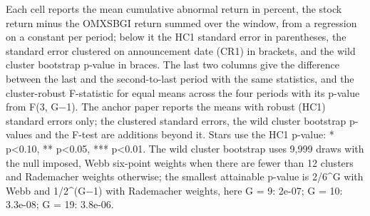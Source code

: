 \begin{threeparttable}
\begin{minipage}{\linewidth}
Each cell reports the mean cumulative abnormal return in percent, the stock return minus the OMXSBGI return summed over the window, from a regression on a constant per period; below it the HC1 standard error in parentheses, the standard error clustered on announcement date (CR1) in brackets, and the wild cluster bootstrap p-value in braces. The last two columns give the difference between the last and the second-to-last period with the same statistics, and the cluster-robust F-statistic for equal means across the four periods with its p-value from F(3, G$-$1). The anchor paper reports the means with robust (HC1) standard errors only; the clustered standard errors, the wild cluster bootstrap p-values and the F-test are additions beyond it. Stars use the HC1 p-value: * p<0.10, ** p<0.05, *** p<0.01. The wild cluster bootstrap uses 9,999 draws with the null imposed, Webb six-point weights when there are fewer than 12 clusters and Rademacher weights otherwise; the smallest attainable p-value is 2/6\textasciicircum{}G with Webb and 1/2\textasciicircum{}(G$-$1) with Rademacher weights, here G = 9: 2e-07; G = 10: 3.3e-08; G = 19: 3.8e-06.\end{minipage}

\end{threeparttable}